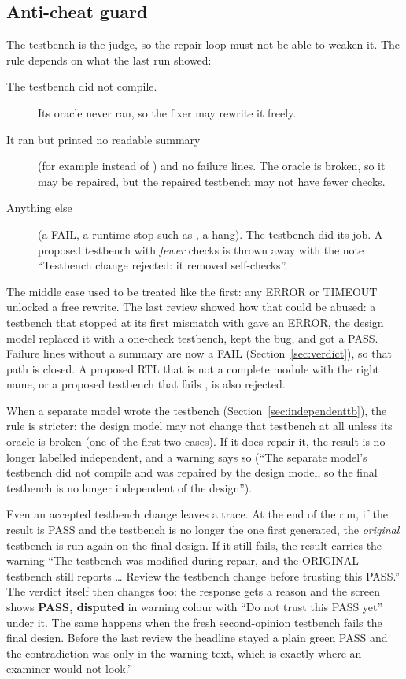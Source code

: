 \subsection{Anti-cheat guard}

The testbench is the judge, so the repair loop must not be able to weaken it. The rule depends on what the last run showed:

\begin{description}
  \item[The testbench did not compile.] Its oracle never ran, so the fixer may rewrite it freely.
  \item[It ran but printed no readable summary] (for example  instead of ) and no failure lines. The oracle is broken, so it may be repaired, but the repaired testbench may not have fewer checks.
  \item[Anything else] (a FAIL, a runtime stop such as , a hang). The testbench did its job. A proposed testbench with \emph{fewer} checks is thrown away with the note ``Testbench change rejected: it removed self-checks''.
\end{description}

The middle case used to be treated like the first: any ERROR or TIMEOUT unlocked a free rewrite. The last review showed how that could be abused: a testbench that stopped at its first mismatch with  gave an ERROR, the design model replaced it with a one-check testbench, kept the bug, and got a PASS. Failure lines without a summary are now a FAIL (Section~\ref{sec:verdict}), so that path is closed. A proposed RTL that is not a complete module with the right name, or a proposed testbench that fails , is also rejected.

When a separate model wrote the testbench (Section~\ref{sec:independenttb}), the rule is stricter: the design model may not change that testbench at all unless its oracle is broken (one of the first two cases). If it does repair it, the result is no longer labelled independent, and a warning says so (``The separate model's testbench did not compile and was repaired by the design model, so the final testbench is no longer independent of the design'').

Even an accepted testbench change leaves a trace. At the end of the run, if the result is PASS and the testbench is no longer the one first generated, the \emph{original} testbench is run again on the final design. If it still fails, the result carries the warning ``The testbench was modified during repair, and the ORIGINAL testbench still reports \ldots{} Review the testbench change before trusting this PASS.'' The verdict itself then changes too: the response gets a  reason and the screen shows \textbf{PASS, disputed} in warning colour with ``Do not trust this PASS yet'' under it. The same happens when the fresh second-opinion testbench fails the final design. Before the last review the headline stayed a plain green PASS and the contradiction was only in the warning text, which is exactly where an examiner would not look.''

